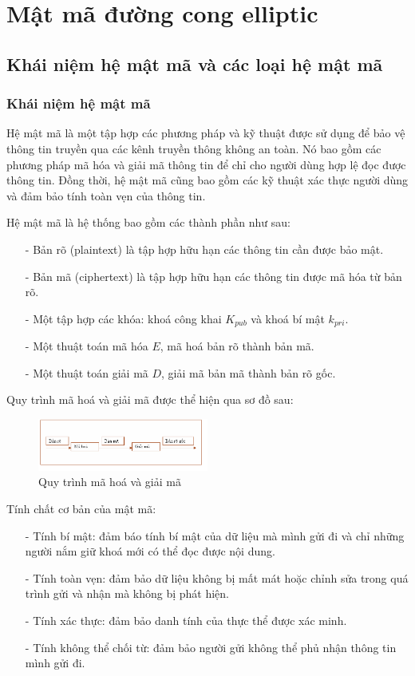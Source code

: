 \section{Mật mã đường cong elliptic}
\subsection{Khái niệm hệ mật mã và các loại hệ mật mã}

\subsubsection{Khái niệm hệ mật mã}
Hệ mật mã là một tập hợp các phương pháp và kỹ thuật được sử dụng để 
bảo vệ thông tin truyền qua các kênh truyền thông không an toàn. Nó 
bao gồm các phương pháp mã hóa và giải mã thông tin để chỉ cho người 
dùng hợp lệ đọc được thông tin. Đồng thời, hệ mật mã cũng bao gồm các 
kỹ thuật xác thực người dùng và đảm bảo tính toàn vẹn của thông tin.

Hệ mật mã là hệ thống bao gồm các thành phần như sau:
\begin{itemize}
    \item[-] Bản rõ (plaintext) là tập hợp hữu hạn các thông tin cần được bảo mật.
    \item[-] Bản mã (ciphertext) là tập hợp hữu hạn các thông tin được mã hóa từ bản rõ.
    \item[-] Một tập hợp các khóa: khoá công khai $K_{pub}$ và khoá bí mật $k_{pri}$.
    \item[-] Một thuật toán mã hóa $E$, mã hoá bản rõ thành bản mã.
    \item[-] Một thuật toán giải mã $D$, giải mã bản mã thành bản rõ gốc.
\end{itemize}

Quy trình mã hoá và giải mã được thể hiện qua sơ đồ sau:
\begin{figure}[h]
    \centering
    \includegraphics[width=0.5\textwidth]{images/encrypt-decrypt.png}
    \caption{Quy trình mã hoá và giải mã}
    \label{fig:encrypt-decrypt}
\end{figure}

Tính chất cơ bản của mật mã:
\begin{itemize}
    \item[-] Tính bí mật: đảm báo tính bí mật của dữ liệu mà mình gửi đi và
        chỉ những người nắm giữ khoá mới có thể đọc được nội dung.
    \item[-] Tính toàn vẹn: đảm bảo dữ liệu không bị mất mát hoặc chỉnh sửa 
    trong quá trình gửi và nhận mà không bị phát hiện.
    \item[-] Tính xác thực: đảm bảo danh tính của thực thể được xác minh.
    \item[-] Tính không thể chối từ:  đảm bảo người gửi không thể phủ nhận
    thông tin mình gửi đi.
\end{itemize}


